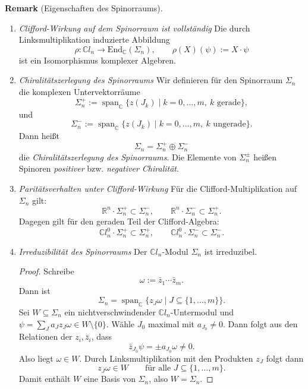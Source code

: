 \documentclass[10pt, letterpaper]{article}
\newcommand{\R}{\mathbb{R}}
\newcommand{\C}{\mathbb{C}}
\newcommand{\End}{\mathrm{End}}
\newcommand{\CustomHeading}[3]{%
  \par\medskip\noindent%
  \textbf{#1 #2} \textnormal{(#3)}.\enskip%
}
\newenvironment{REM}[2]{\CustomHeading{Remark}{#1}{#2}}{}
\begin{document}
\begin{REM}{}{Eigenschaften des Spinorraums}
\begin{enumerate}
    \item \emph{Clifford-Wirkung auf dem Spinorraum ist vollständig}
    Die durch Linksmultiplikation induzierte Abbildung
    \[
    \rho:\C l_n\longrightarrow \End_{\C}(\Sigma_n),\qquad
    \rho(X)(\psi):=X\cdot \psi
    \]
    ist ein Isomorphismus komplexer Algebren.
    \item \emph{Chiralitätszerlegung des Spinorraums}
    Wir definieren für den Spinorraum $\Sigma_n$ die komplexen Untervektorräume
    \[\Sigma_n^{+}:=\operatorname{span}_{\C}\{z(J_k)\mid k=0,\dots,m,\ k \text{ gerade}\},\]
    und
    \[\Sigma_n^{-}:=\operatorname{span}_{\C}\{z(J_k)\mid k=0,\dots,m,\ k \text{ ungerade}\}.\]
    Dann heißt
    \[\Sigma_n=\Sigma_n^{+}\oplus \Sigma_n^{-}\]
    die \emph{Chiralitätszerlegung des Spinorraums}. Die Elemente von $\Sigma_n^\pm$
    heißen Spinoren \emph{positiver} bzw. \emph{negativer Chiralität}.
    \item \emph{Paritätsverhalten unter Clifford-Wirkung}
    Für die Clifford-Multiplikation auf $\Sigma_n$ gilt:
    \[
    \R^n\cdot \Sigma_n^+ \subset \Sigma_n^-,
    \qquad
    \R^n\cdot \Sigma_n^- \subset \Sigma_n^+.
    \]
    Dagegen gilt für den geraden Teil der Clifford-Algebra:
    \[
    \C l_n^0\cdot \Sigma_n^+ \subset \Sigma_n^+,
    \qquad
    \C l_n^0\cdot \Sigma_n^- \subset \Sigma_n^-.
    \]
    \item \emph{Irreduzibilität des Spinorraums}
    Der \(\C l_n\)-Modul \(\Sigma_n\) ist irreduzibel.

    \begin{proof}
    Schreibe
    \[
    \omega:=\bar z_1\cdots \bar z_m.
    \]
    Dann ist
    \[
    \Sigma_n=\operatorname{span}_\C\{z_J\omega \mid J\subseteq \{1,\dots,m\}\}.
    \]
    Sei \(W\subseteq \Sigma_n\) ein nichtverschwindender \(\C l_n\)-Untermodul
    und \(\psi=\sum_J a_J z_J\omega\in W\setminus\{0\}\). Wähle \(J_0\) maximal mit
    \(a_{J_0}\neq 0\). Dann folgt aus den Relationen der \(z_i,\bar z_i\), dass
    \[
    \bar z_{J_0}\psi=\pm a_{J_0}\omega\neq 0.
    \]
    Also liegt \(\omega\in W\). Durch Linksmultiplikation mit den Produkten \(z_J\)
    folgt dann
    \[
    z_J\omega\in W
    \qquad
    \text{für alle }J\subseteq \{1,\dots,m\}.
    \]
    Damit enthält \(W\) eine Basis von \(\Sigma_n\), also \(W=\Sigma_n\).
    \end{proof}
\end{enumerate}
\end{REM}
\end{document}
